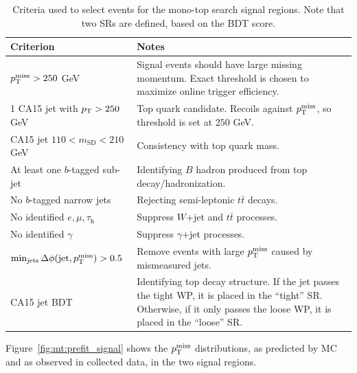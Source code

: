 \begin{table}[]
    \caption{Criteria used to select events for the mono-top search signal regions. Note that two SRs are defined, based on the BDT score.}
    \label{tab:mt:cuts}
    \begin{tabular}{p{}p{}}
        Criterion & Notes \\
        \hline
        \hline
        $p_\mathrm{T}^\mathrm{miss}>250$ GeV & Signal events should have large missing momentum. Exact threshold is chosen to maximize online trigger efficiency. \\
        1 CA15 jet with $p_\mathrm{T}>250$ GeV & Top quark candidate. Recoils against $p_\mathrm{T}^\mathrm{miss}$, so threshold is set at $250$ GeV. \\
        CA15 jet $110 < m_\mathrm{SD} < 210$ GeV & Consistency with top quark mass. \\
        At least one $b$-tagged sub-jet & Identifying $B$ hadron produced from top decay/hadronization. \\
        No $b$-tagged narrow jets & Rejecting semi-leptonic $t\bar{t}$ decays. \\
        \hline
        No identified $e,\mu,\tau_\mathrm{h}$ & Suppress $W$+jet and $t\bar{t}$ processes. \\
        No identified $\gamma$ & Suppress $\gamma$+jet processes. \\
        \hline
        $\min_\mathrm{jets}\Delta\phi(\mathrm{jet},p_\mathrm{T}^\mathrm{miss}) > 0.5$ & Remove events with large $p_\mathrm{T}^\mathrm{miss}$ caused by mismeasured jets. \\
        \hline
        CA15 jet BDT & Identifying top decay structure. If the jet passes the tight WP, it is placed in the ``tight'' SR. Otherwise, if it only passes the loose WP, it is placed in the ``loose'' SR.\\
    \end{tabular}
\end{table}

Figure~\ref{fig:mt:prefit_signal} shows the $p_\mathrm{T}^\mathrm{miss}$ distributions, as predicted by MC and as observed in collected data, in the two signal regions.

